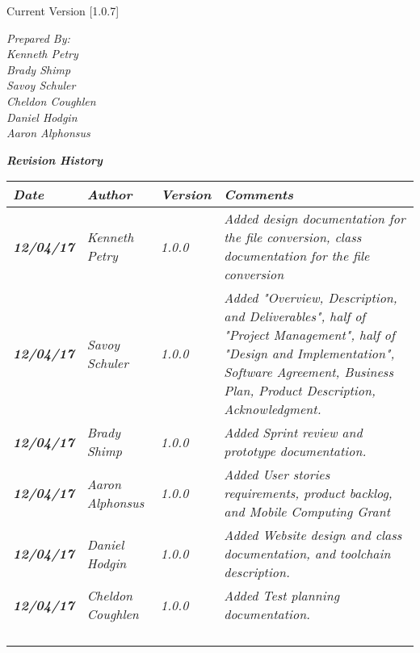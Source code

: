 


Current Version [1.0.7]
\vspace*{5mm}

{\color{SDColor5}
\noindent
\textit{Prepared By:}\\
\textit{Kenneth Petry}\\
\textit{Brady Shimp}\\
\textit{Savoy Schuler}\\
\textit{Cheldon Coughlen}\\
\textit{Daniel Hodgin}\\
\textit{Aaron Alphonsus}
}

\vfill
\noindent
{\color{SDColor3} \textit{\textbf{Revision History}}}\\
\begin{tabular}{|>{\raggedright}p{1.5cm}|>{\raggedright}p{3cm}|>{\raggedright}p{1.5cm}|>{\raggedright}p{9cm}|}
  \hline
  \textit{\textbf{Date}} &  \textit{\textbf{Author}} & \textit{\textbf{Version}} & \textit{\textbf{Comments}}\tabularnewline
  \hline
  \textit{\textbf{12/04/17}} & \textit{Kenneth Petry} & \textit{1.0.0} & \textit{Added design documentation for the file conversion, class documentation for the file conversion}\tabularnewline\hline
  \textit{\textbf{12/04/17}} & \textit{Savoy Schuler} & \textit{1.0.0} & \textit{Added "Overview, Description, and Deliverables", half of "Project Management", half of "Design and Implementation", Software Agreement, Business Plan, Product Description, Acknowledgment.} \tabularnewline\hline
  \textit{\textbf{12/04/17}} & \textit{Brady Shimp} & \textit{1.0.0} & \textit{Added Sprint review and prototype documentation.}\tabularnewline\hline
  \textit{\textbf{12/04/17}} & \textit{Aaron Alphonsus} & \textit{1.0.0} & \textit{Added User stories requirements, product backlog, and Mobile Computing Grant}\tabularnewline\hline
  \textit{\textbf{12/04/17}} & \textit{Daniel Hodgin} & \textit{1.0.0} & \textit{Added Website design and class documentation, and toolchain description.}\tabularnewline\hline
  \textit{\textbf{12/04/17}} & \textit{Cheldon Coughlen} & \textit{1.0.0} & \textit{Added Test planning documentation.}\tabularnewline\hline
  &  &  & \tabularnewline
  \hline
  &  &  & \tabularnewline
  \hline
  &  &  & \tabularnewline
  \hline
  &  &  & \tabularnewline
  \hline
\end{tabular}
\vfill

